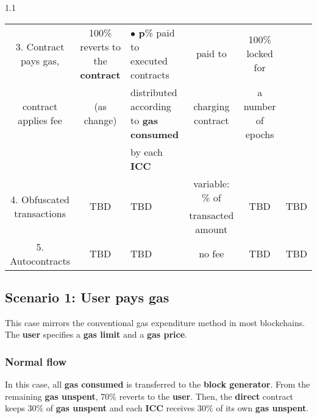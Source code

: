 \documentclass[twocolumn, nofootinbib]{revtex4-2} %
\newcommand{\emphasize}[1]{\textbf{#1}\xspace}
\newcommand{\blockgenerator}{\emphasize{block generator}}
\newcommand{\contract}{\emphasize{contract}}
\newcommand{\direct}{\emphasize{direct}}
\newcommand{\gasprice}{\emphasize{gas price}}
\newcommand{\gaslimit}{\emphasize{gas limit}}
\newcommand{\gasconsumed}{\emphasize{gas consumed}}
\newcommand{\gasunspent}{\emphasize{gas unspent}}
\newcommand{\icc}{\emphasize{ICC}}
\newcommand{\user}{\emphasize{user}}
\newcommand{\emphp}{\emphasize{p}}
\begin{document}
\begin{table*}[t]
\begin{spacing}{1.1}
{\begin{tabular}{| c | c | l | c | c | c |}
					3. Contract pays gas,
					& 100\% reverts to the \contract
                    & $\bullet$ \emphp\% paid to executed contracts
					& paid to
					& 100\% locked for
					&
					\\
					contract applies fee
					& (as change)
                    & \hspace{0.2cm} distributed according to \gasconsumed
					& charging contract
					& a number of epochs
					&
					\\
					&
                    & \hspace{0.2cm} by each \icc
					&
					&
					&
					\\ \hline
					\multirow{2}{*}{4. Obfuscated transactions}
					& \multirow{2}{*}{TBD}
					& \multirow{2}{*}{TBD}
					& variable: \% of
					& \multirow{2}{*}{TBD}
					& \multirow{2}{*}{TBD}
					\\

					&
					&
					& transacted amount
					&
					&
					\\
					\hline
					5. Autocontracts
					& TBD
					& TBD
					& no fee
					& TBD
					& TBD
					\\
					\hline
				\end{tabular}
			}
			\caption{Summary of how gas and fees are handled in each scenario.}
			\label{tab:gas}
		\end{spacing}
	\end{table*}

    \subsection{Scenario 1: User pays gas}\label{sec:specifications:scenario-1}
    This case mirrors the conventional gas expenditure method in most
    blockchains.
    The \user specifies a \gaslimit and a \gasprice.

    \subsubsection{Normal flow}\label{sec:specifications:scenario-1:normal-flow}

    In this case, all \gasconsumed is transferred to the \blockgenerator. From the remaining \gasunspent, 70\% reverts to the \user. Then, the \direct contract keeps 30\% of \gasunspent and each \icc receives 30\% of its own \gasunspent.
\end{document}
